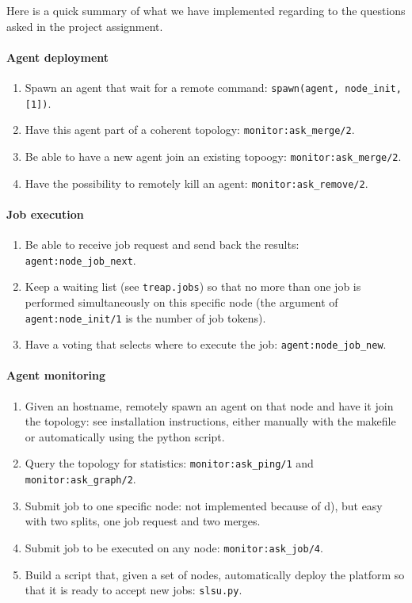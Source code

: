 \documentclass[a4paper, 11pt]{article}
\begin{document}
Here is a quick summary of what we have implemented regarding to the questions asked in the project assignment.

\paragraph{Agent deployment}
\begin{enumerate}[label=\alph*)]
	\item Spawn an agent that wait for a remote command: \verb|spawn(agent, node_init, [1])|.
	\item Have this agent part of a coherent topology: \verb|monitor:ask_merge/2|.
	\item Be able to have a new agent join an existing topoogy: \verb|monitor:ask_merge/2|.
	\item Have the possibility to remotely kill an agent: \verb|monitor:ask_remove/2|.
\end{enumerate}

\paragraph{Job execution}

\begin{enumerate}[label=\alph*)]
  \item Be able to receive job request and send back the results: \verb|agent:node_job_next|.
  \item Keep a waiting list (see \verb|treap.jobs|) so that no more than one job is performed simultaneously on this specific node (the argument of \verb|agent:node_init/1| is the number of job tokens).
  \item Have a voting that selects where to execute the job: \verb|agent:node_job_new|.
\end{enumerate}

\paragraph{Agent monitoring}
\begin{enumerate}[label=\alph*)]
	\item Given an hostname, remotely spawn an agent on that node and have it join the topology: see installation instructions, either manually with the makefile or automatically using the python script.
	\item Query the topology for statistics: \verb|monitor:ask_ping/1| and \verb|monitor:ask_graph/2|.
	\item Submit job to one specific node: not implemented because of d), but easy with two splits, one job request and two merges. 
	\item Submit job to be executed on any node: \verb|monitor:ask_job/4|.
	\item Build a script that, given a set of nodes, automatically deploy the platform so that it is ready to accept new jobs: \verb|slsu.py|.
\end{enumerate}
\end{document}
